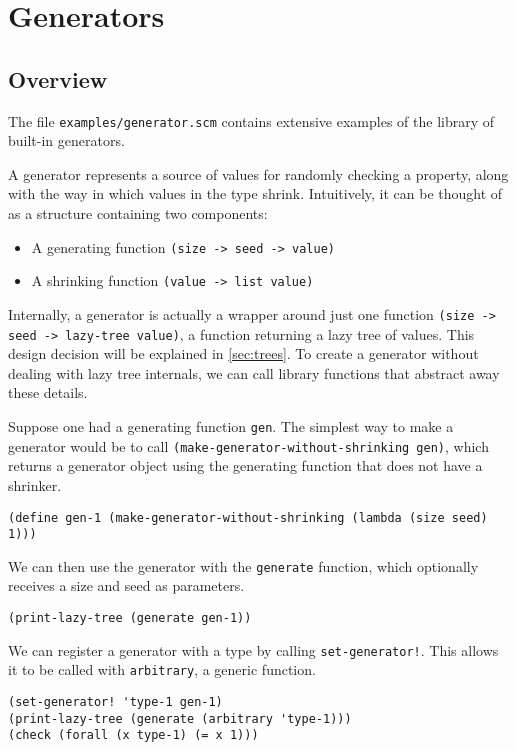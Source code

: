 \documentclass{scrartcl}
\begin{document}
\section{Generators}\label{sec:generators}
\subsection{Overview}

The file \verb|examples/generator.scm| contains extensive examples of the
library of built-in generators.

A generator represents a source of values for randomly checking a property,
along with the way in which values in the type shrink.
Intuitively, it can be thought of as a structure containing two components:
\begin{itemize}
\item A generating function \verb|(size -> seed -> value)|
\item A shrinking function \verb|(value -> list value)|
\end{itemize}
Internally, a generator is actually a wrapper around just one function
\verb|(size -> seed -> lazy-tree value)|, a function returning a lazy tree of
values. This design decision will be explained in
\cref{sec:trees}.
To create a generator without dealing with lazy tree internals,
we can call library functions that abstract away these details.

Suppose one had a generating function \verb|gen|. The simplest way to make a
generator would be to call \verb|(make-generator-without-shrinking gen)|,
which returns a generator object using the generating function that does not
have a shrinker.
\begin{verbatim}
(define gen-1 (make-generator-without-shrinking (lambda (size seed) 1)))
\end{verbatim}

We can then use the generator with the \verb|generate| function,
which optionally receives a size and seed as parameters.
\begin{verbatim}
(print-lazy-tree (generate gen-1))
\end{verbatim}

We can register a generator with a type by calling \verb|set-generator!|. This
allows it to be called with \verb|arbitrary|, a generic function.

\begin{verbatim}
(set-generator! 'type-1 gen-1)
(print-lazy-tree (generate (arbitrary 'type-1)))
(check (forall (x type-1) (= x 1)))
\end{verbatim}
\end{document}
